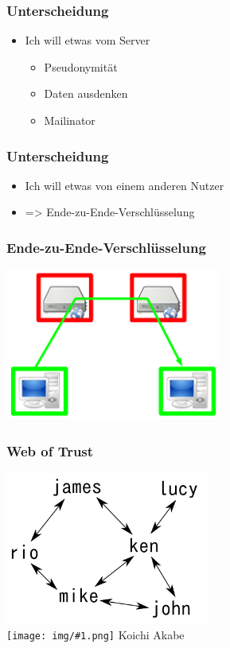 \documentclass[12pt]{beamer}
\newcommand{\cc}[1]{\texttt{[image: img/\#1.png]}\hspace{1mm}}
\begin{document}
\begin{frame}
    \frametitle{Unterscheidung}
    \begin{itemize}
      \item<2-> Ich will etwas vom Server
        \begin{itemize}
          \item<3-> Pseudonymität
          \item<4-> Daten ausdenken
          \item<5-> Mailinator
        \end{itemize}
    \end{itemize}
\end{frame}

\begin{frame}
    \frametitle{Unterscheidung}
    \begin{itemize}
      \item<2-> Ich will etwas von einem anderen Nutzer
      \item<3-> => Ende-zu-Ende-Verschlüsselung
    \end{itemize}
\end{frame}

\begin{frame}
    \frametitle{Ende-zu-Ende-Verschlüsselung}
    \begin{center}
      \includegraphics[height=5cm]{img/fed-end-to-end.png}
    \end{center}
\end{frame}

\begin{frame}
    \frametitle{Web of Trust}
    \begin{center}
      \includegraphics[height=5cm]{img/weboftrust.png}
      \\{\small \cc{by-sa} Koichi Akabe}
    \end{center}
\end{frame}
\end{document}
